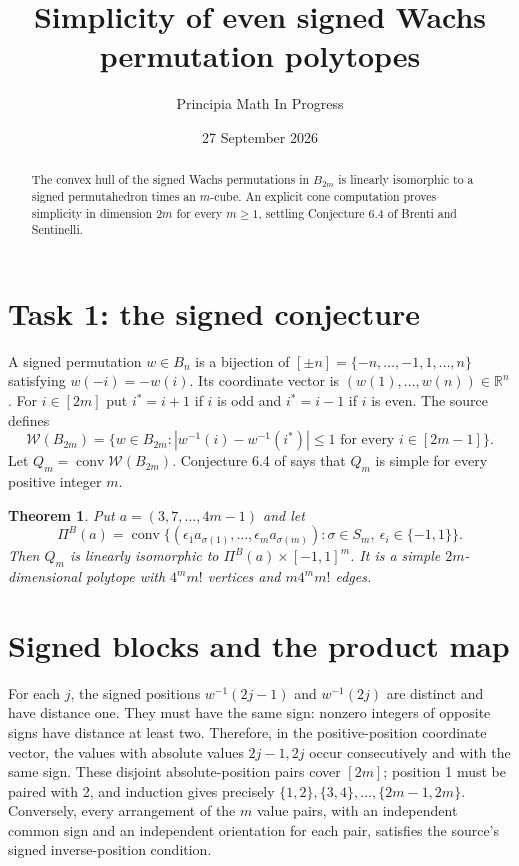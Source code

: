 \documentclass[11pt]{article}
\title{Simplicity of even signed Wachs permutation polytopes}
\author{Principia Math In Progress}
\date{27 September 2026}
\newtheorem{theorem}{Theorem}
\newcommand{\conv}{\operatorname{conv}}
\newcommand{\W}{\mathcal W}
\begin{document}
\maketitle
\begin{abstract}
The convex hull of the signed Wachs permutations in $B_{2m}$ is
linearly isomorphic to a signed permutahedron times an $m$-cube.
An explicit cone computation proves simplicity in dimension $2m$ for
every $m\geq1$, settling Conjecture 6.4 of Brenti and Sentinelli.
\end{abstract}

\section*{Task 1: the signed conjecture}
A signed permutation $w\in B_n$ is a bijection of
$[\pm n]=\{-n,\ldots,-1,1,\ldots,n\}$ satisfying $w(-i)=-w(i)$.
Its coordinate vector is $(w(1),\ldots,w(n))\in\mathbb R^n$.
For $i\in[2m]$ put $i^*=i+1$ if $i$ is odd and $i^*=i-1$ if $i$ is even.
The source defines
\[
 \W(B_{2m})=\{w\in B_{2m}:|w^{-1}(i)-w^{-1}(i^*)|\leq1
                  \text{ for every }i\in[2m-1]\}.
\]
Let $Q_m=\conv\W(B_{2m})$. Conjecture 6.4 of \cite{BS} says that
$Q_m$ is simple for every positive integer $m$.

\begin{theorem}\label{main}
Put $a=(3,7,\ldots,4m-1)$ and let
\[
 \Pi^B(a)=\conv\{(\epsilon_1a_{\sigma(1)},\ldots,
             \epsilon_ma_{\sigma(m)}):\sigma\in S_m,\ \epsilon_i\in\{-1,1\}\}.
\]
Then $Q_m$ is linearly isomorphic to $\Pi^B(a)\times[-1,1]^m$.
It is a simple $2m$-dimensional polytope with $4^m m!$ vertices
and $m4^m m!$ edges.
\end{theorem}

\section*{Signed blocks and the product map}
For each $j$, the signed positions $w^{-1}(2j-1)$ and $w^{-1}(2j)$
are distinct and have distance one. They must have the same sign:
nonzero integers of opposite signs have distance at least two.
Therefore, in the positive-position coordinate vector, the values with
absolute values $2j-1,2j$ occur consecutively and with the same sign.
These disjoint absolute-position pairs cover $[2m]$; position 1 must
be paired with 2, and induction gives precisely
$\{1,2\},\{3,4\},\ldots,\{2m-1,2m\}$.
Conversely, every arrangement of the $m$ value pairs, with an
independent common sign and an independent orientation for each pair,
satisfies the source's signed inverse-position condition.
\end{document}
